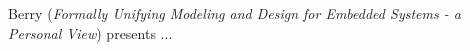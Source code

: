 

Berry
\cite{isola-2016-berry}
({\em Formally Unifying Modeling and Design for
Embedded Systems - a Personal View})
presents ...

